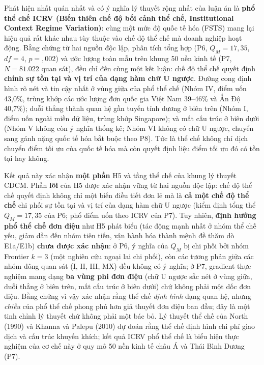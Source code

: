 \documentclass[
  a4paper,
  13pt]{extreport}
\begin{document}
Phát hiện nhất quán nhất và có ý nghĩa lý thuyết rộng nhất của luận án
là \textbf{phổ thể chế ICRV (Biến thiên chế độ bối cảnh thể chế,
Institutional Context Regime Variation)}: cùng một mức độ quốc tế hóa
(FSTS) mang lại hiệu quả rất khác nhau tùy thuộc vào chế độ thể chế mà
doanh nghiệp hoạt động. Bằng chứng từ hai nguồn độc lập, phân tích tổng
hợp (P6, \(Q_M = 17{,}35\), \(df = 4\), \(p = {,}002\)) và ước lượng
toàn mẫu trên khung 50 nền kinh tế (P7, \(N = 81.022\) quan sát), đều
chỉ đến cùng một kết luận: chế độ thể chế quyết định \textbf{chính sự
tồn tại và vị trí của dạng hàm chữ U ngược}. Đường cong định hình rõ nét
và tin cậy nhất ở vùng giữa của phổ thể chế (Nhóm IV, điểm uốn 43,0\%,
trùng khớp các ước lượng đơn quốc gia Việt Nam 39--46\% và Ấn Độ
40,7\%); duỗi thẳng thành quan hệ gần tuyến tính dương ở biên trên (Nhóm
I, điểm uốn ngoài miền dữ liệu, trùng khớp Singapore); và mất cấu trúc ở
biên dưới (Nhóm V không còn ý nghĩa thống kê; Nhóm VI không có chữ U
ngược, chuyển sang gánh nặng quốc tế hóa bắt buộc theo P8). Tức là thể
chế không chỉ dịch chuyển điểm tối ưu của quốc tế hóa mà còn quyết định
liệu điểm tối ưu đó có tồn tại hay không.

Kết quả này xác nhận \textbf{một phần} H5 và tầng thể chế của khung lý
thuyết CDCM. Phần \textbf{lõi} của H5 được xác nhận vững từ hai nguồn
độc lập: chế độ thể chế quyết định không chỉ một biến điều tiết đơn lẻ
mà là \textbf{cả một chế độ thể chế} chi phối sự tồn tại và vị trí của
dạng hàm chữ U ngược (kiểm định tổng thể \(Q_M = 17{,}35\) của P6; phổ
điểm uốn theo ICRV của P7). Tuy nhiên, \textbf{định hướng phổ thể chế
đơn điệu} như H5 phát biểu (tác động mạnh nhất ở nhóm thể chế yếu, giảm
dần đến nhóm tiên tiến, vận hành hóa thành mệnh đề thăm dò E1a/E1b)
\textbf{chưa được xác nhận}: ở P6, ý nghĩa của \(Q_M\) bị chi phối bởi
nhóm Frontier \(k = 3\) (một nghiên cứu ngoại lai chi phối), còn các
tương phản giữa các nhóm đông quan sát (I, II, III, MX) đều không có ý
nghĩa; ở P7, gradient thực nghiệm mang dạng \textbf{ba vùng phi đơn
điệu} (chữ U ngược sắc nét ở vùng giữa, duỗi thẳng ở biên trên, mất cấu
trúc ở biên dưới) chứ không phải một dốc đơn điệu. Bằng chứng vì vậy xác
nhận rằng thể chế \emph{định hình} dạng quan hệ, nhưng \emph{chiều} của
phổ thể chế phong phú hơn giả thuyết đơn điệu ban đầu; đây là một tinh
chỉnh lý thuyết chứ không phải một bác bỏ. Lý thuyết thể chế của North
(1990) và Khanna và Palepu (2010) dự đoán rằng thể chế định hình chi phí
giao dịch và cấu trúc khuyến khích; kết quả ICRV phổ thể chế là biểu
hiện thực nghiệm của cơ chế này ở quy mô 50 nền kinh tế châu Á và Thái
Bình Dương (P7).
\end{document}
